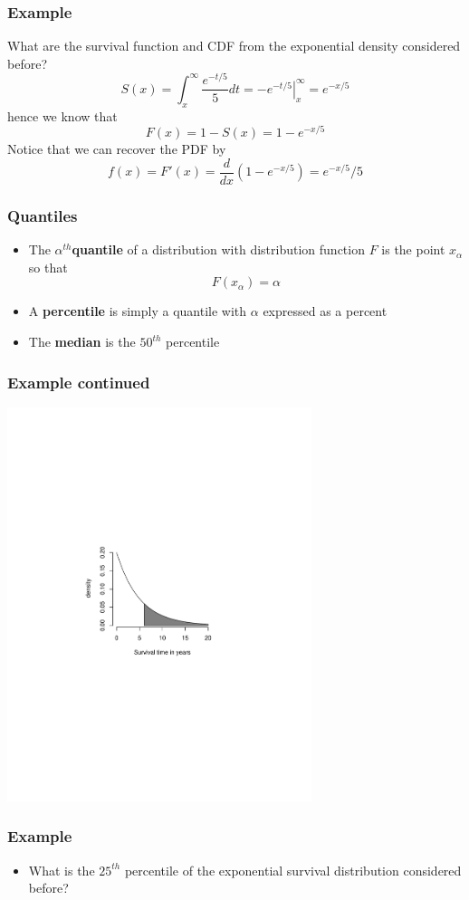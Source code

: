 \documentclass[aspectratio=169]{beamer}
\begin{document}
\begin{frame}
\frametitle{Example}
What are the survival function and CDF from the exponential density considered before?
$$
S(x) = \int_x^\infty  \frac{e^{-t/5}}{5}dt =  \left. -e^{-t/5} \right|_{x}^\infty = e^{-x/5}
$$
hence we know that
$$
F(x) = 1 - S(x) = 1 - e^{-x/5}
$$
Notice that we can recover the PDF by
$$
f(x) = F'(x) = \frac{d}{dx} (1 -  e^{-x/5}) = e^{-x/5}/5
$$
\end{frame}


\begin{frame}
\frametitle{Quantiles}
\begin{itemize}
\item The  {\bf $\alpha^{th}$quantile} of a distribution with distribution function 
$F$ is the point $x_\alpha$ so that
$$
F(x_\alpha) = \alpha
$$
\item A {\bf percentile} is simply a quantile with $\alpha$ expressed as a percent
\item The {\bf median} is the $50^{th}$ percentile
\end{itemize}
\end{frame}

\begin{frame}
\frametitle{Example continued}
   \includegraphics[width=3.5in]{exponential.pdf}
\end{frame}


\begin{frame}
\frametitle{Example}
\begin{itemize}
\item  What is the $25^{th}$ percentile of the exponential survival distribution considered before?
\end{itemize}
\end{frame}
\end{document}
